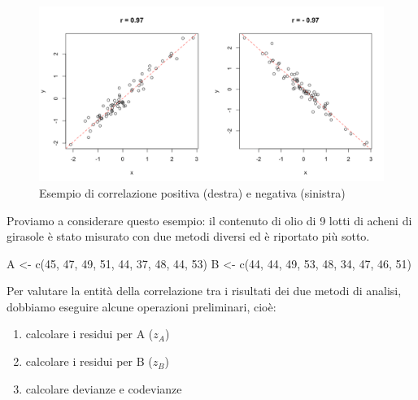 \documentclass[a4paper,12pt,oneside]{book}
\providecommand{\tightlist}{%
  \setlength{\itemsep}{0pt}\setlength{\parskip}{0pt}}
\newenvironment{Shaded}{\begin{snugshade}}{\end{snugshade}}
\newcommand{\DecValTok}[1]{#1}
\newcommand{\OtherTok}[1]{#1}
\newcommand{\FunctionTok}[1]{#1}
\newcommand{\NormalTok}[1]{#1}
\begin{document}
\begin{figure}

{\centering \includegraphics[width=0.75\linewidth]{_images/CorrelationExample} 

}

\caption{Esempio di correlazione positiva (destra) e negativa (sinistra)}\label{fig:figName311}
\end{figure}

Proviamo a considerare questo esempio: il contenuto di olio di 9 lotti di acheni di girasole è stato misurato con due metodi diversi ed è riportato più sotto.

\begin{Shaded}
\begin{Highlighting}[]
\NormalTok{A }\OtherTok{\textless{}{-}} \FunctionTok{c}\NormalTok{(}\DecValTok{45}\NormalTok{, }\DecValTok{47}\NormalTok{, }\DecValTok{49}\NormalTok{, }\DecValTok{51}\NormalTok{, }\DecValTok{44}\NormalTok{, }\DecValTok{37}\NormalTok{, }\DecValTok{48}\NormalTok{, }\DecValTok{44}\NormalTok{, }\DecValTok{53}\NormalTok{)}
\NormalTok{B }\OtherTok{\textless{}{-}} \FunctionTok{c}\NormalTok{(}\DecValTok{44}\NormalTok{, }\DecValTok{44}\NormalTok{, }\DecValTok{49}\NormalTok{, }\DecValTok{53}\NormalTok{, }\DecValTok{48}\NormalTok{, }\DecValTok{34}\NormalTok{, }\DecValTok{47}\NormalTok{, }\DecValTok{46}\NormalTok{, }\DecValTok{51}\NormalTok{)}
\end{Highlighting}
\end{Shaded}

Per valutare la entità della correlazione tra i risultati dei due metodi di analisi, dobbiamo eseguire alcune operazioni preliminari, cioè:

\begin{enumerate}
\def\labelenumi{\arabic{enumi}.}
\tightlist
\item
  calcolare i residui per A (\(z_A\))
\item
  calcolare i residui per B (\(z_B\))
\item
  calcolare devianze e codevianze
\end{enumerate}
\end{document}
